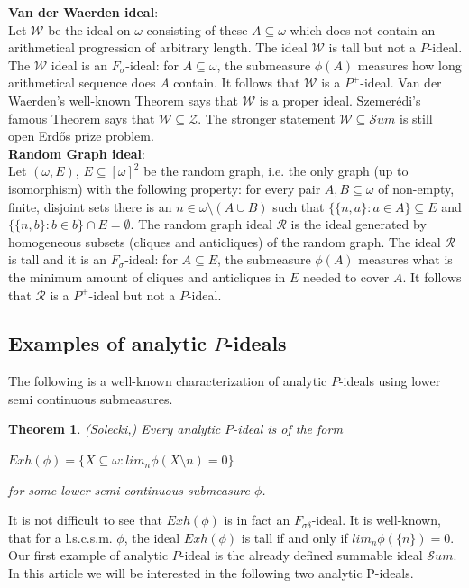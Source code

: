 \documentclass[a4paper]{amsart}
\newtheorem{theorem}{Theorem}[section]
\newcommand{\RandomGraph}{\mathcal{R}}
\newcommand{\Z}{\mathcal{Z}}
\newcommand{\SUM}{\mathcal{S}um}
\newcommand{\WANDER}{\mathcal{W}}
\begin{document}
\textbf{Van der Waerden ideal}:\\
        Let $\WANDER$ be the ideal on $\omega$ consisting of these $A\subseteq\omega$ which does not contain an arithmetical progression of arbitrary length. The ideal $\WANDER$ is tall but not a $P$-ideal. The $\WANDER$ ideal is an $F_{\sigma}$-ideal: for $A\subseteq\omega$, the submeasure $\phi(A)$ measures how long arithmetical sequence does $A$ contain. It follows that $\WANDER$ is a $P^+$-ideal. Van der Waerden’s well-known Theorem says that $\WANDER$ is a proper ideal. Szemerédi’s famous Theorem says that $\WANDER\subseteq\Z$. The stronger statement $\WANDER\subseteq\SUM$ is still open Erdős prize problem.\\
        
\textbf{Random Graph ideal}:\\
        Let $(\omega,E)$, $E\subseteq[\omega]^{2}$ be the random graph, i.e. the only graph (up to isomorphism) with the following property: for every pair $A,B\subseteq\omega$ of non-empty, finite, disjoint sets there is an $n\in\omega\setminus(A\cup B)$ such that $\{\{n,a\}:a\in A\}\subseteq E$ and $\{\{n,b\}:b\in b\}\cap E=\emptyset$. The random graph ideal $\RandomGraph$ is the ideal generated by homogeneous subsets (cliques and anticliques) of the random graph. The ideal $\RandomGraph$ is tall and it is an $F_{\sigma}$-ideal: for $A\subseteq E$, the submeasure $\phi(A)$ measures what is the minimum amount of cliques and anticliques in $E$ needed to cover $A$. It follows that $\RandomGraph$ is a $P^{+}$-ideal but not a $P$-ideal.

\subsection{Examples of analytic $P$-ideals}
The following is a well-known characterization of analytic $P$-ideals using lower semi continuous submeasures.
\begin{theorem}(Solecki,\cite{SoleckiExh})
    Every analytic $P$-ideal is of the form
    \begin{center}
        $Exh(\phi)=\{X\subseteq\omega: lim_{n}\phi(X\setminus n)=0\}$
    \end{center}
    for some lower semi continuous submeasure $\phi$.
\end{theorem}
It is not difficult to see that $Exh(\phi)$ is in fact an $F_{\sigma\delta}$-ideal. It is well-known, that for a l.s.c.s.m. $\phi$, the ideal $Exh(\phi)$ is tall if and only if $lim_{n}\phi(\{n\})=0$. Our first example of analytic $P$-ideal is the already defined summable ideal $\SUM$. In this article we will be interested in the following two analytic P-ideals.\\
\end{document}
